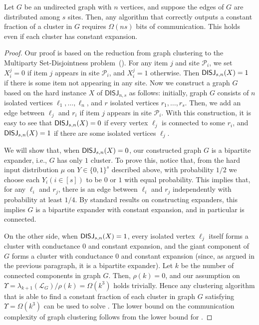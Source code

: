 \begin{thm}\label{thm:lbmsg}
Let $G$ be an undirected graph with $n$ vertices, and suppose the edges of $G$ are distributed among $s$ sites. Then, any algorithm that correctly outputs a constant fraction of a cluster in $G$ requires $\Omega(ns)$ bits of communication. This holds even if each cluster has constant expansion.  
\end{thm}



\begin{proof}
Our proof is based on the reduction from graph clustering to the Multiparty Set-Disjointness problem~(\DISJN).
For any item $j$ and site $\mathcal{P}_i$, we set $X^j_i=0$ if item $j$ appears in site $\mathcal{P}_i$, and $X^j_i=1$ otherwise.
Then $\text{{$\mathsf{DISJ}_{s,n}$}}(X)=1$ if there is some item not appearing in any site.  Now we construct a graph $G$ based on the hard instance $X$ of 
$\mathsf{DISJ}_{n,s}$ as follows: initially,  graph $G$ consists of  $n$ isolated vertices $\ell_1,\ldots, \ell_n$, and $r$ isolated vertices $r_1,\ldots, r_s$. Then, we add an edge between $\ell_j$ and $r_i$ if item $j$ appears in site $\mathcal{P}_i$. With this construction, it is easy to see that $\text{{$\mathsf{DISJ}_{s,n}$}}(X)=0$ if every vertex $\ell_j$ is connected to some $r_i$, and $\text{{$\mathsf{DISJ}_{s,n}$}}(X)=1$ if there are some isolated vertices $\ell_j$. 


We will show that, when $\text{{$\mathsf{DISJ}_{s,n}$}}(X)=0$, our constructed  graph $G$ is a bipartite expander, i.e., $G$ has only $1$ cluster.   To prove this, notice that, from the hard input distribution $\mu$ on $Y\in\{0,1\}^s$  described above, with probability $1/2$ we choose each $Y_i(i\in [s])$ to be $0$ or $1$ with equal probability. This implies that, for any $\ell_i$ and $r_j$, there is an edge between $\ell_i$ and $r_j$ independently with probability at least $1/4$. By standard results on constructing expanders, this implies $G$ is a bipartite expander with constant expansion, and in particular is connected.   

On the other side, when $\text{{$\mathsf{DISJ}_{s,n}$}}(X)=1$, every isolated vertex $\ell_j$ itself forms a cluster with conductance $0$ and constant expansion, and the giant component of $G$ forms a cluster with conductance $0$ and constant expansion (since, as argued in the previous paragraph, it is a bipartite expander). Let $k$ be the number of connected  components in graph $G$. Then, $\rho(k)=0$, and our assumption on $\Upsilon=\lambda_{k+1}(\mathcal{L}_G)/\rho(k)=\Omega(k^3)$ holds trivially. Hence any clustering algorithm  that is able to find a constant fraction of each cluster in graph $G$ satisfying $\Upsilon=\Omega(k^3)$ can be used to solve \DISJN. The lower bound on the communication complexity of graph clustering follows from the lower bound for \DISJN.  
\end{proof}




